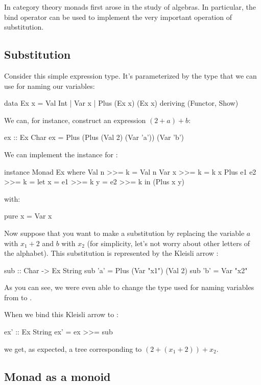 \documentclass[DaoFP]{subfiles}
\begin{document}
In category theory monads first arose in the study of algebras. In particular, the bind operator can be used to implement the very important operation of substitution. 

\subsection{Substitution}

Consider this simple expression type. It's parameterized by the type  that we can use for naming our variables:
\begin{haskell}
data Ex x = Val Int 
          | Var x 
          | Plus (Ex x) (Ex x) 
 deriving (Functor, Show)
\end{haskell}
We can, for instance, construct an expression $(2 + a) + b$:
\begin{haskell}
ex :: Ex Char
ex = Plus (Plus (Val 2) (Var 'a')) (Var 'b')
\end{haskell}
We can implement the  instance for :
\begin{haskell}
instance Monad Ex where
  Val n >>= k = Val n
  Var x >>= k = k x
  Plus e1 e2 >>= k = 
    let x = e1 >>= k
        y = e2 >>= k
    in (Plus x y)
\end{haskell}
with:    
\begin{haskell}
  pure x = Var x 
\end{haskell}

Now suppose that you want to make a substitution by replacing the variable $a$ with $x_1 + 2$ and $b$ with $x_2$ (for simplicity, let's not worry about other letters of the alphabet). This substitution is represented by the Kleisli arrow :
\begin{haskell}
sub :: Char -> Ex String
sub 'a' = Plus (Var "x1") (Val 2)
sub 'b' = Var "x2"
\end{haskell}
As you can see, we were even able to change the type used for naming variables from  to .

When we bind this Kleisli arrow to :
\begin{haskell}
ex' :: Ex String
ex' = ex >>= sub
\end{haskell}
we get, as expected, a tree corresponding to $(2 + (x_1 + 2)) + x_2$.

\subsection{Monad as a monoid}
\end{document}
